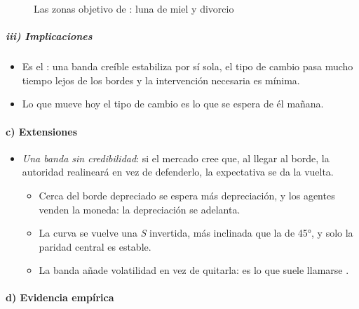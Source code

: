 \documentclass[11pt]{article}
\begin{document}
\begin{figure}[H]
\centering
\caption{Las zonas objetivo de : luna de miel y divorcio}\label{fig:zona-objetivo}
\end{figure}

\subparagraph{iii) Implicaciones}

\begin{itemize}
\item Es el : una banda creíble estabiliza por sí sola, el tipo de cambio pasa mucho tiempo lejos de los bordes y la intervención necesaria es mínima.
\item Lo que mueve hoy el tipo de cambio es lo que se espera de él mañana.
\end{itemize}

\paragraph{c) Extensiones}

\begin{itemize}
\item \emph{Una banda sin credibilidad}: si el mercado cree que, al llegar al borde, la autoridad realineará en vez de defenderlo, la expectativa se da la vuelta\nocite{BertolaCaballero1992Target}.
  \begin{itemize}
  \item Cerca del borde depreciado se espera más depreciación, y los agentes venden la moneda: la depreciación se adelanta.
  \item La curva se vuelve una \emph{S} invertida, más inclinada que la de 45°, y solo la paridad central es estable.
  \item La banda añade volatilidad en vez de quitarla: es lo que suele llamarse .
  \end{itemize}
\end{itemize}

\paragraph{d) Evidencia empírica}
\end{document}
